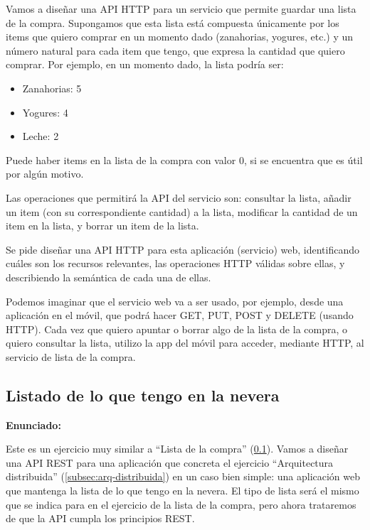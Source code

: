 Vamos a diseñar una API HTTP para un servicio que permite guardar una lista de la compra. Supongamos que esta lista está compuesta únicamente por los items que quiero comprar en un momento dado (zanahorias, yogures, etc.) y un número natural para cada item que tengo, que expresa la cantidad que quiero comprar. Por ejemplo, en un momento dado, la lista podría ser:

\begin{itemize}
\item Zanahorias: 5
\item Yogures: 4
\item Leche: 2
\end{itemize}

Puede haber items en la lista de la compra con valor 0, si se encuentra que es útil por algún motivo.

Las operaciones que permitirá la API del servicio son: consultar la lista, añadir un item (con su correspondiente cantidad) a la lista, modificar la cantidad de un item en la lista, y borrar un item de la lista.

Se pide diseñar una API HTTP para esta aplicación (servicio) web, identificando cuáles son los recursos relevantes, las operaciones HTTP válidas sobre ellas, y describiendo la semántica de cada una de ellas.

Podemos imaginar que el servicio web va a ser usado, por ejemplo, desde una aplicación en el móvil, que podrá hacer GET, PUT, POST y DELETE (usando HTTP). Cada vez que quiero apuntar o borrar algo de la lista de la compra, o quiero consultar la lista, utilizo la app del móvil para acceder, mediante HTTP, al servicio de lista de la compra.

\subsection{Listado de lo que tengo en la nevera}
\label{subsec:contenido-nevera}

\textbf{Enunciado:}

Este es un ejercicio muy similar a ``Lista de la compra'' (\ref{subsec:contenido-nevera}). Vamos a diseñar una API REST para una aplicación que concreta el ejercicio ``Arquitectura distribuida'' (\ref{subsec:arq-distribuida}) en un caso bien simple: una aplicación web que mantenga la lista de lo que tengo en la nevera. El tipo de lista será el mismo que se indica para en el ejercicio de la lista de la compra, pero ahora trataremos de que la API cumpla los principios REST.

